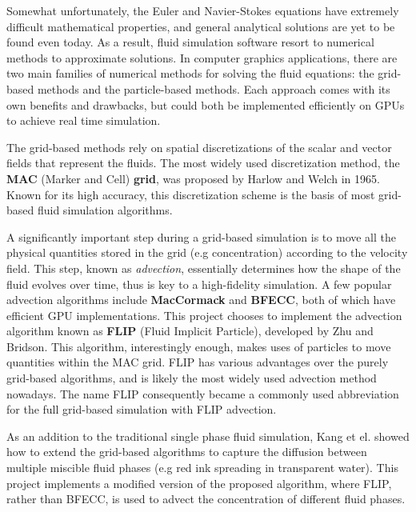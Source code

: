 Somewhat unfortunately, the Euler and Navier-Stokes equations have extremely difficult mathematical properties, and general analytical solutions are yet to be found even today. As a result, fluid simulation software resort to numerical methods to approximate solutions. In computer graphics applications, there are two main families of numerical methods for solving the fluid equations: the grid-based methods and the particle-based methods. Each approach comes with its own benefits and drawbacks, but could both be implemented efficiently on GPUs to achieve real time simulation.

The grid-based methods rely on spatial discretizations of the scalar and vector fields that represent the fluids. The most widely used discretization method, the \textbf{MAC} (Marker and Cell) \textbf{grid}, was proposed by Harlow and Welch \cite{harlow1965numerical} in 1965. Known for its high accuracy, this discretization scheme is the basis of most grid-based fluid simulation algorithms. 

A significantly important step during a grid-based simulation is to move all the physical quantities stored in the grid (e.g concentration) according to the velocity field. This step, known as \textit{advection}, essentially determines how the shape of the fluid evolves over time, thus is key to a high-fidelity simulation. A few popular advection algorithms include \textbf{MacCormack}\cite{selle2008unconditionally} and \textbf{BFECC}\cite{kim2005flowfixer}, both of which have efficient GPU implementations\cite{chentanez2011real}\cite{xu2011interactive}. This project chooses to implement the advection algorithm known as \textbf{FLIP} (Fluid Implicit Particle)\cite{zhu2005animating}, developed by Zhu and Bridson. This algorithm, interestingly enough, makes uses of particles to move quantities within the MAC grid. FLIP has various advantages over the purely grid-based algorithms, and is likely the most widely used advection method nowadays. The name FLIP consequently became a commonly used abbreviation for the full grid-based simulation with FLIP advection.

As an addition to the traditional single phase fluid simulation, Kang et el.\cite{kang2010hybrid} showed how to extend the grid-based algorithms to capture the diffusion between multiple miscible fluid phases (e.g red ink spreading in transparent water). This project implements a modified version of the proposed algorithm, where FLIP, rather than BFECC, is used to advect the concentration of different fluid phases.



